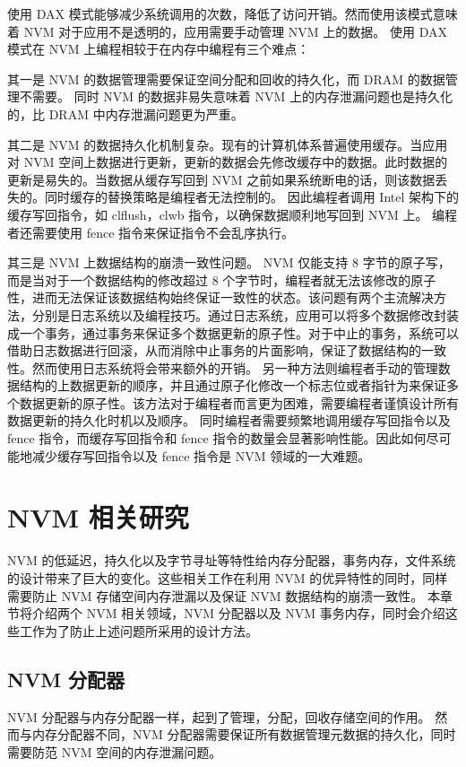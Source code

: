 使用 DAX 模式能够减少系统调用的次数，降低了访问开销。然而使用该模式意味着 NVM 对于应用不是透明的，应用需要手动管理 NVM 上的数据。
使用 DAX 模式在 NVM 上编程相较于在内存中编程有三个难点：

其一是 NVM 的数据管理需要保证空间分配和回收的持久化，而 DRAM 的数据管理不需要。
同时 NVM 的数据非易失意味着 NVM 上的内存泄漏问题也是持久化的，比 DRAM 中内存泄漏问题更为严重。

其二是 NVM 的数据持久化机制复杂。现有的计算机体系普遍使用缓存。当应用对 NVM 空间上数据进行更新，更新的数据会先修改缓存中的数据。此时数据的更新是易失的。当数据从缓存写回到 NVM 之前如果系统断电的话，则该数据丢失的。同时缓存的替换策略是编程者无法控制的。
因此编程者调用 Intel 架构下的缓存写回指令，如 clflush，clwb 指令，以确保数据顺利地写回到 NVM 上。
编程者还需要使用 fence 指令来保证指令不会乱序执行。

其三是 NVM 上数据结构的崩溃一致性问题。
NVM 仅能支持 8 字节的原子写，而是当对于一个数据结构的修改超过 8 个字节时，编程者就无法该修改的原子性，进而无法保证该数据结构始终保证一致性的状态。该问题有两个主流解决方法，分别是日志系统以及编程技巧。通过日志系统，应用可以将多个数据修改封装成一个事务，通过事务来保证多个数据更新的原子性。对于中止的事务，系统可以借助日志数据进行回滚，从而消除中止事务的片面影响，保证了数据结构的一致性。然而使用日志系统将会带来额外的开销。
另一种方法则编程者手动的管理数据结构的上数据更新的顺序，并且通过原子化修改一个标志位或者指针为来保证多个数据更新的原子性。该方法对于编程者而言更为困难，需要编程者谨慎设计所有数据更新的持久化时机以及顺序。
同时编程者需要频繁地调用缓存写回指令以及 fence 指令，而缓存写回指令和 fence 指令的数量会显著影响性能。因此如何尽可能地减少缓存写回指令以及 fence 指令是 NVM 领域的一大难题。

\section{NVM 相关研究}

NVM 的低延迟，持久化以及字节寻址等特性给内存分配器，事务内存，文件系统的设计带来了巨大的变化。这些相关工作在利用 NVM 的优异特性的同时，同样需要防止 NVM 存储空间内存泄漏以及保证 NVM 数据结构的崩溃一致性。
本章节将介绍两个 NVM 相关领域，NVM 分配器以及 NVM 事务内存，同时会介绍这些工作为了防止上述问题所采用的设计方法。

\subsection{NVM 分配器}

NVM 分配器与内存分配器一样，起到了管理，分配，回收存储空间的作用。
然而与内存分配器不同，NVM 分配器需要保证所有数据管理元数据的持久化，同时需要防范 NVM 空间的内存泄漏问题。

